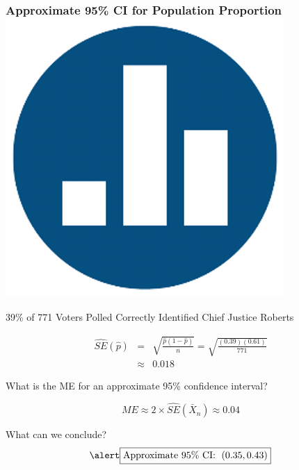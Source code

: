 \begin{frame}
\frametitle{Approximate 95\% CI for Population Proportion\hfill \includegraphics[scale = 0.05]{./images/clicker}}
39\% of 771 Voters Polled Correctly Identified Chief Justice Roberts

\begin{eqnarray*}
	\widehat{SE}(\widehat{p}) &=& \sqrt{\frac{\widehat{p}(1-\widehat{p})}{n}} = \sqrt{\frac{(0.39)(0.61)}{771}}\\ 
	&\approx& 0.018 
\end{eqnarray*}

\alert{What is the ME for an approximate 95\% confidence interval?} \pause

$$ME \approx 2 \times \widehat{SE}(\bar{X}_n) \approx 0.04$$ \pause

\vspace{-1em}

What can we conclude?
\vspace{-1em}
$$\alert{\boxed{\mbox{Approximate 95\% CI: } \; (0.35, 0.43)}}$$

\end{frame}


